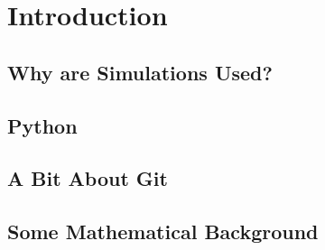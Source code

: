 \section{Introduction}
\subsection{Why are Simulations Used?}
\subsection{Python}
\subsection{A Bit About Git}
\subsection{Some Mathematical Background}
